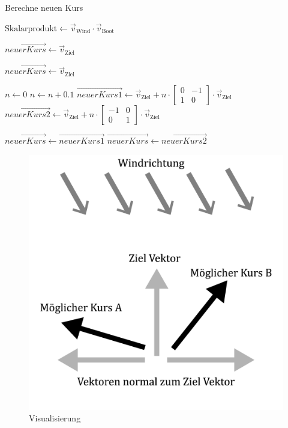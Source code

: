 \begin{algorithm}
\caption{Berechne neuen Kurs}
\begin{algorithmic}[1]
    \State $\text{Skalarprodukt} \gets \vec{v}_{\text{Wind}} \cdot \vec{v}_{\text{Boot}}$
    
    \State $\vec{neuerKurs} \gets \vec{v}_{\text{Ziel}}$
    
            \State $\vec{neuerKurs} \gets \vec{v}_{\text{Ziel}}$
            \State \Return {}
        \EndIf
        
        \State $n \gets 0$
            \State $n \gets n + 0.1$
            \State $\vec{neuerKurs1} \gets \vec{v}_{\text{Ziel}} + n \cdot \begin{bmatrix}0 & -1 \\ 1 & 0\end{bmatrix} \cdot \vec{v}_{\text{Ziel}}$
            \State $\vec{neuerKurs2} \gets \vec{v}_{\text{Ziel}} + n \cdot \begin{bmatrix}-1 & 0 \\ 0 & 1\end{bmatrix} \cdot \vec{v}_{\text{Ziel}}$
            
                \State $\vec{neuerKurs} \gets \vec{neuerKurs1}$
            \Else
                \State $\vec{neuerKurs} \gets \vec{neuerKurs2}$
            \EndIf
        \EndWhile
        
        \State \Return {}
    \EndIf
\EndFunction
\end{algorithmic}
\end{algorithm}
 

\begin{figure}[H]
    \centering
    \includegraphics[width=0.5\linewidth]{algorythmus Vektoren.png}
    \caption{Visualisierung}
    \label{fig:enter-label}
\end{figure}




